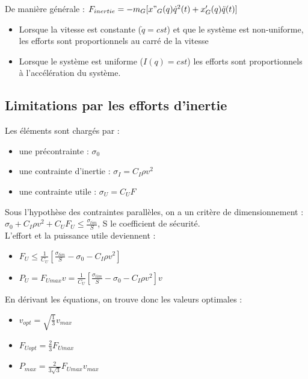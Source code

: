 \documentclass[../main.tex]{subfiles}
\begin{document}
De manière générale : $F_{inertie} = -m_G [x"_G(q) \dot{q}^2(t) + x'_G(q) \Ddot{q}(t)]$\\

\begin{itemize}
    \item Lorsque la vitesse est constante ($\dot{q} = cst$) et que le système est non-uniforme, les efforts sont proportionnels au carré de la vitesse\\
    \item Lorsque le système est uniforme ($I(q) = cst$) les efforts sont proportionnels à l'accélération du système.\\
\end{itemize}

\subsection{Limitations par les efforts d'inertie}

Les éléments sont chargés par : \begin{itemize}
    \item une précontrainte : $\sigma_0$\\
    \item une contrainte d'inertie : $\sigma_I = C_I \rho v^2$\\
    \item une contrainte utile : $\sigma_U= C_U F$\\
\end{itemize}

Sous l'hypothèse des contraintes parallèles, on a un critère de dimensionnement : $\sigma_0 + C_I \rho v^2 + C_U F_U \leq \frac{\sigma_{lim}}{S}$, S le coefficient de sécurité.\\

L'effort et la puissance utile deviennent : \begin{itemize}
    \item $F_U \leq \frac{1}{C_U} [\frac{\sigma_{lim}}{S} -  \sigma_0 - C_I \rho v^2]$\\
    \item $P_U = F_{U max} v = \frac{1}{C_U} [\frac{\sigma_{lim}}{S} - \sigma_0 - C_I \rho v^2] v$\\
\end{itemize}

En dérivant les équations, on trouve donc les valeurs optimales : \begin{itemize}
    \item $v_{opt} = \sqrt{\frac{1}{3}} v_{max}$\\
    \item $F_{U opt} = \frac{2}{3} F_{U max}$\\
    \item $P_{max} = \frac{2}{3\sqrt{3}} F_{U max} v_{max}$\\
\end{itemize}
\end{document}
